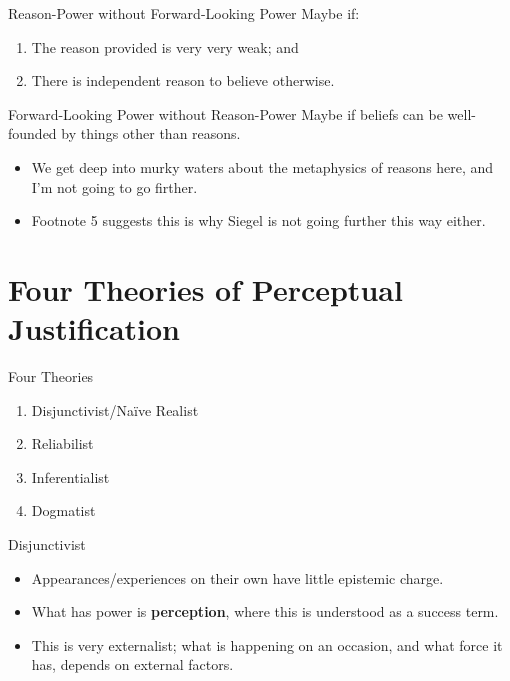 \documentclass[
  17pt,
  letterpaper,
  ignorenonframetext,
  aspectratio=169,
  xcolor={dvipsnames}]{beamer}
\providecommand{\tightlist}{%
  \setlength{\itemsep}{0pt}\setlength{\parskip}{0pt}}\usepackage{longtable,booktabs,array}
\begin{document}
\begin{frame}{Reason-Power without Forward-Looking Power}
\protect\hypertarget{reason-power-without-forward-looking-power}{}
Maybe if:

\begin{enumerate}[<+->]
[(a)]
\tightlist
\item
  The reason provided is very very weak; and
\item
  There is independent reason to believe otherwise.
\end{enumerate}
\end{frame}

\begin{frame}{Forward-Looking Power without Reason-Power}
\protect\hypertarget{forward-looking-power-without-reason-power}{}
Maybe if beliefs can be well-founded by things other than reasons.

\begin{itemize}[<+->]
\tightlist
\item
  We get deep into murky waters about the metaphysics of reasons here,
  and I'm not going to go firther.
\item
  Footnote 5 suggests this is why Siegel is not going further this way
  either.
\end{itemize}
\end{frame}

\hypertarget{four-theories-of-perceptual-justification}{%
\section{Four Theories of Perceptual
Justification}\label{four-theories-of-perceptual-justification}}

\begin{frame}{Four Theories}
\protect\hypertarget{four-theories}{}
\begin{enumerate}[<+->]
\tightlist
\item
  Disjunctivist/Naïve Realist
\item
  Reliabilist
\item
  Inferentialist
\item
  Dogmatist
\end{enumerate}
\end{frame}

\begin{frame}{Disjunctivist}
\protect\hypertarget{disjunctivist}{}
\begin{itemize}[<+->]
\tightlist
\item
  Appearances/experiences on their own have little epistemic charge.
\item
  What has power is \textbf{perception}, where this is understood as a
  success term.
\item
  This is very externalist; what is happening on an occasion, and what
  force it has, depends on external factors.
\end{itemize}
\end{frame}
\end{document}
